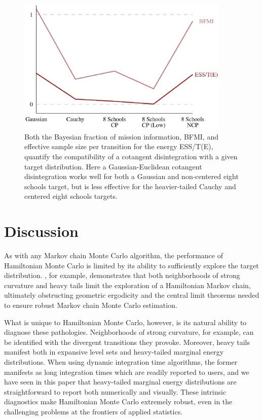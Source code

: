 \documentclass[stslayout]{imsart}
\begin{document}
\begin{figure}
\centering
\includegraphics[width=4in]{experiment_results.eps}
\caption{Both the Bayesian fraction of mission information, BFMI, 
and effective sample size per transition for the energy ESS/T(E),
quantify the compatibility of a cotangent disintegration with a
given target distribution.  Here a Gaussian-Euclidean cotangent
disintegration works well for both a Gaussian and non-centered eight
schools target, but is less effective for the heavier-tailed Cauchy
and centered eight schools targets.}
\label{fig:num_diagnostics}
\end{figure}

\section{Discussion}

As with any Markov chain Monte Carlo algorithm, the performance of 
Hamiltonian Monte Carlo is limited by its ability to sufficiently explore 
the target distribution.  \cite{LivingstoneEtAl:2016},
for example, demonstrates that both neighborhoods of strong curvature 
and heavy tails limit the exploration of a Hamiltonian Markov chain,
ultimately obstructing geometric ergodicity and the central limit theorems 
needed to ensure robust Markov chain Monte Carlo estimation.

What is unique to Hamiltonian Monte Carlo, however, is its natural
ability to diagnose these pathologies.  Neighborhoods of strong
curvature, for example, can be identified with the divergent transitions
they provoke.  Moreover, heavy tails manifest both in expansive level 
sets and heavy-tailed marginal energy distributions.  When using
dynamic integration time algorithms, the former manifests as long
integration times which are readily reported to users, and we have
seen in this paper that heavy-tailed marginal energy distributions
are straightforward to report both numerically and visually.  These
intrinsic diagnostics make Hamiltonian Monte Carlo extremely
robust, even in the challenging problems at the frontiers of applied statistics.
\end{document}
